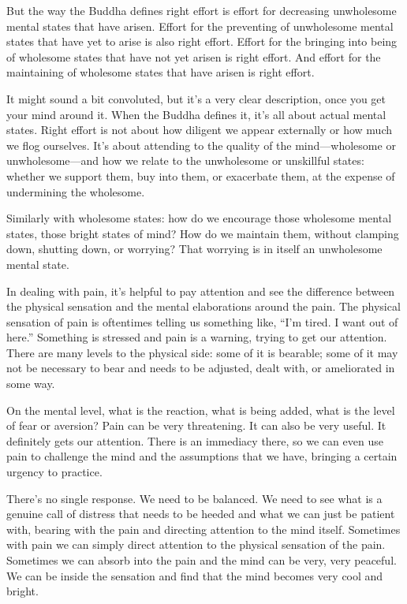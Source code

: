 But the way the Buddha defines right effort is effort for decreasing
unwholesome mental states that have arisen. Effort for the preventing of
unwholesome mental states that have yet to arise is also right effort.
Effort for the bringing into being of wholesome states that have not yet
arisen is right effort. And effort for the maintaining of wholesome
states that have arisen is right effort.

It might sound a bit convoluted, but it’s a very clear description, once
you get your mind around it. When the Buddha defines it, it’s all about
actual mental states. Right effort is not about how diligent we appear
externally or how much we flog ourselves. It’s about attending to the
quality of the mind—wholesome or unwholesome—and how we relate to the
unwholesome or unskillful states: whether we support them, buy into
them, or exacerbate them, at the expense of undermining the wholesome.

Similarly with wholesome states: how do we encourage those wholesome
mental states, those bright states of mind? How do we maintain them,
without clamping down, shutting down, or worrying? That worrying is in
itself an unwholesome mental state.

In dealing with pain, it’s helpful to pay attention and see the
difference between the physical sensation and the mental elaborations
around the pain. The physical sensation of pain is oftentimes telling us
something like, “I’m tired. I want out of here.” Something is stressed
and pain is a warning, trying to get our attention. There are many
levels to the physical side: some of it is bearable; some of it may not
be necessary to bear and needs to be adjusted, dealt with, or
ameliorated in some way.

On the mental level, what is the reaction, what is being added, what is
the level of fear or aversion? Pain can be very threatening. It can also
be very useful. It definitely gets our attention. There is an immediacy
there, so we can even use pain to challenge the mind and the assumptions
that we have, bringing a certain urgency to practice.

There’s no single response. We need to be balanced. We need to see what
is a genuine call of distress that needs to be heeded and what we can
just be patient with, bearing with the pain and directing attention to
the mind itself. Sometimes with pain we can simply direct attention to
the physical sensation of the pain. Sometimes we can absorb into the
pain and the mind can be very, very peaceful. We can be inside the
sensation and find that the mind becomes very cool and bright.


